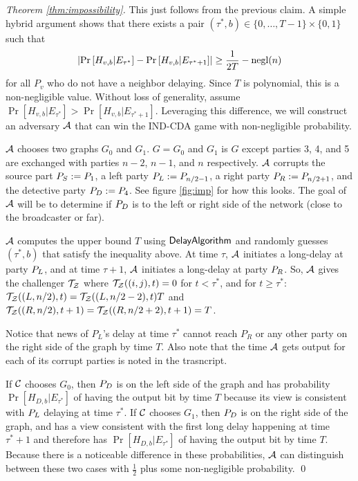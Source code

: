 \begin{proof}[Theorem \ref{thm:impossibility}]
	This just follows from the previous claim. A simple hybrid argument shows that there exists a pair $(\tau^*, b) \in \{0,\ldots, T-1\} \times \{0,1\}$ such that 
	\[ \lvert \Pr \left[H_{v,b} | E_{\tau^*} \right] - \Pr \left[ H_{v,b} | E_{\tau^* + 1} \right] \rvert \geq \frac 1 {2T} - \text{negl}(n) \]
	for all $P_v$ who do not have a neighbor delaying. Since $T$ is polynomial, this is a non-negligible value. Without loss of generality, assume $\Pr[ H_{v,b} | E_{\tau^*}] > \Pr[H_{v,b} | E_{\tau^* + 1}]$. Leveraging this difference, we will construct an adversary $\mathcal{A}$ that can win the IND-CDA game with non-negligible probability.
	
	$\mathcal{A}$ chooses two graphs $G_0$ and $G_1$. $G = G_0$ and $G_1$ is $G$ except parties 3, 4, and 5 are exchanged with parties $n-2$, $n-1$, and $n$ respectively. $\mathcal{A}$ corrupts the source part $P_S := P_1$, a left party $P_L := P_{n/2-1}$, a right party $P_R := P_{n/2 + 1}$, and the detective party $P_D := P_4$. See figure \ref{fig:imp} for how this looks. The goal of $\mathcal{A}$ will be to determine if $P_D$ is to the left or right side of the network (close to the broadcaster or far).
	
	$\mathcal{A}$ computes the upper bound $T$ using $\mathsf{DelayAlgorithm}$ and randomly guesses $(\tau^*, b)$ that satisfy the inequality above. At time $\tau$, $\mathcal{A}$ initiates a long-delay at party $P_L$, and at time $\tau+1$, $\mathcal{A}$ initiates a long-delay at party $P_R$. So, $\mathcal{A}$ gives the challenger $\mathcal{T}_{\mathcal{Z}}$ where $\mathcal{T}_{\mathcal{Z}}((i,j), t) = 0$ for $t < \tau^*$, and for $t \geq \tau^*$: $\mathcal{T}_{\mathcal{Z}}((L, n/2), t) = \mathcal{T}_{\mathcal{Z}}((L, n/2-2), t) T$ and $\mathcal{T}_{\mathcal{Z}}((R, n/2), t+1) = \mathcal{T}_{\mathcal{Z}}((R, n/2 + 2), t+1) = T$.
	
	Notice that news of $P_L$'s delay at time $\tau^*$ cannot reach $P_R$ or any other party on the right side of the graph by time $T$. Also note that the time $\mathcal{A}$ gets output for each of its corrupt parties is noted in the trasncript.
	
	If $\mathcal{C}$ chooses $G_0$, then $P_D$ is on the left side of the graph and has probability $\Pr[H_{D, b} | E_{\tau^*}]$ of having the output bit by time $T$ because its view is consistent with $P_L$ delaying at time $\tau^*$.
	If $\mathcal{C}$ chooses $G_1$, then $P_D$ is on the right side of the graph, and has a view consistent with the first long delay happening at time $\tau^*+1$ and therefore has $\Pr[H_{D,b} | E_{\tau^*}]$ of having the output bit by time $T$.
	Because there is a noticeable difference in these probabilities, $\mathcal{A}$ can distinguish between these two cases with $\frac 1 2$ plus some non-negligible probability.
	\qed
\end{proof}

